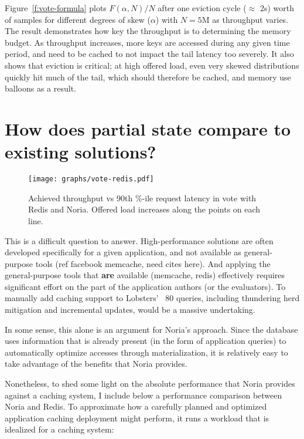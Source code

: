 Figure~\ref{f:vote-formula} plots $F(\alpha, N)/N$ after one eviction cycle
($\approx$ 2s) worth of samples for different degrees of skew ($\alpha$) with
$N=5\text{M}$ as throughput varies. The result demonstrates how key the
throughput is to determining the memory budget. As throughput increases, more
keys are accessed during any given time period, and need to be cached to not
impact the tail latency too severely. It also shows that eviction is critical;
at high offered load, even very skewed distributions quickly hit much of the
tail, which should therefore be cached, and memory use balloons as a result.

\section{How does partial state compare to existing solutions?}
\label{s:eval:existing}

\begin{figure}[h]
  \centering
  \texttt{[image: graphs/vote-redis.pdf]}
  \caption{Achieved throughput vs 90th \%-ile request latency in vote with Redis
  and Noria. Offered load increases along the points on each line.}
  \label{f:vote-redis}
\end{figure}

This is a difficult question to answer. High-performance solutions are
often developed specifically for a given application, and not available
as general-purpose tools (ref facebook memcache, need cites here).
And applying the general-purpose tools that \textbf{are} available (memcache,
redis) effectively requires significant effort on the part of the application
authors (or the evaluators). To manually add caching support to Lobsters' ~80
queries, including thundering herd mitigation and incremental updates, would be
a massive undertaking.

In some sense, this alone is an argument for Noria's approach. Since the
database uses information that is already present (in the form of application
queries) to automatically optimize accesses through materialization, it is
relatively easy to take advantage of the benefits that Noria provides.

Nonetheless, to shed some light on the absolute performance that Noria provides
against a caching system, I include below a performance comparison between Noria
and Redis. To approximate how a carefully planned and optimized application
caching deployment might perform, it runs a workload that is idealized for a
caching system:

